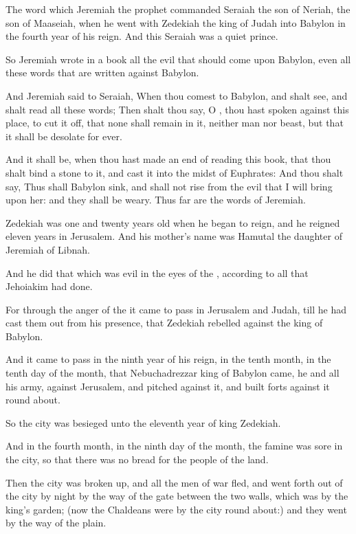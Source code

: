 \Verse The word which Jeremiah the prophet commanded Seraiah the son of Neriah, the son of Maaseiah, when he went with Zedekiah the king of Judah into Babylon in the fourth year of his reign. And this Seraiah was a quiet prince.

\Verse So Jeremiah wrote in a book all the evil that should come upon Babylon, even all these words that are written against Babylon.

\Verse And Jeremiah said to Seraiah, When thou comest to Babylon, and shalt see, and shalt read all these words; \Verse Then shalt thou say, O \LORD, thou hast spoken against this place, to cut it off, that none shall remain in it, neither man nor beast, but that it shall be desolate for ever.

\Verse And it shall be, when thou hast made an end of reading this book, that thou shalt bind a stone to it, and cast it into the midst of Euphrates: \Verse And thou shalt say, Thus shall Babylon sink, and shall not rise from the evil that I will bring upon her: and they shall be weary. Thus far are the words of Jeremiah.


\Chapter
\Verse Zedekiah was one and twenty years old when he began to reign, and he reigned eleven years in Jerusalem. And his mother's name was Hamutal the daughter of Jeremiah of Libnah.

\Verse And he did that which was evil in the eyes of the \LORD, according to all that Jehoiakim had done.

\Verse For through the anger of the \LORD it came to pass in Jerusalem and Judah, till he had cast them out from his presence, that Zedekiah rebelled against the king of Babylon.

\Verse And it came to pass in the ninth year of his reign, in the tenth month, in the tenth day of the month, that Nebuchadrezzar king of Babylon came, he and all his army, against Jerusalem, and pitched against it, and built forts against it round about.

\Verse So the city was besieged unto the eleventh year of king Zedekiah.

\Verse And in the fourth month, in the ninth day of the month, the famine was sore in the city, so that there was no bread for the people of the land.

\Verse Then the city was broken up, and all the men of war fled, and went forth out of the city by night by the way of the gate between the two walls, which was by the king's garden; (now the Chaldeans were by the city round about:) and they went by the way of the plain.

